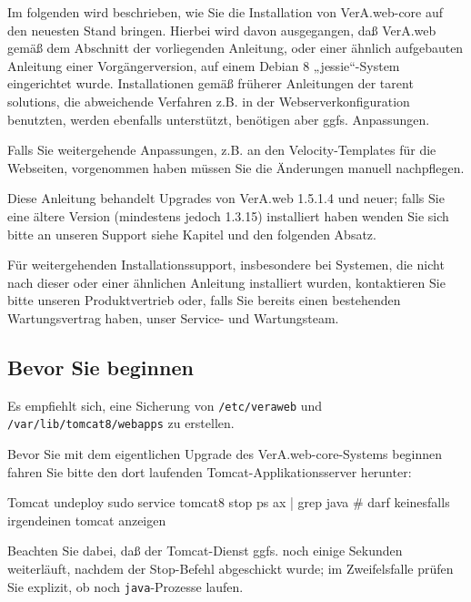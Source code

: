 \documentclass{tarentanleitung}
\begin{document}
Im folgenden wird beschrieben, wie Sie die Installation von
VerA.web-core auf den neuesten Stand bringen.
Hierbei wird davon ausgegangen, daß VerA.web gemäß
  dem Abschnitt  der vorliegenden Anleitung,
  oder einer ähnlich aufgebauten Anleitung einer Vorgängerversion,
auf einem Debian 8 „jessie“-System eingerichtet
wurde. Installationen gemäß früherer Anleitungen der tarent solutions,
die abweichende Verfahren z.B. in der Webserverkonfiguration benutzten,
werden ebenfalls unterstützt, benötigen aber ggfs. Anpassungen.

Falls Sie weitergehende Anpassungen, z.B. an den Velocity-Templates
für die Webseiten, vorgenommen haben müssen Sie die Änderungen
manuell nachpflegen.

Diese Anleitung behandelt Upgrades von VerA.web 1.5.1.4 und neuer;
falls Sie eine ältere Version (mindestens jedoch 1.3.15) installiert
haben wenden Sie sich bitte an unseren Support \dash siehe Kapitel
 und den folgenden Absatz.

Für weitergehenden Installationssupport, insbesondere bei Systemen,
die nicht nach dieser oder einer ähnlichen Anleitung installiert
wurden, kontaktieren Sie bitte unseren Produktvertrieb oder, falls
Sie bereits einen bestehenden Wartungsvertrag haben, unser Service-
und Wartungsteam.

\subsection{Bevor Sie beginnen}\label{subsec:upgrade-core-pre}

Es empfiehlt sich, eine Sicherung von \texttt{/etc/veraweb} und
\texttt{/var/lib/tomcat8/webapps} zu erstellen.

\begin{minipage}{\linewidth}
Bevor Sie mit dem eigentlichen Upgrade des VerA.web-core-Systems beginnen
fahren Sie bitte den dort laufenden Tomcat-Applikationsserver herunter:

\begin{lstdump}{Tomcat undeploy}
sudo service tomcat8 stop
ps ax | grep java               # darf keinesfalls irgendeinen tomcat anzeigen
\end{lstdump}

Beachten Sie dabei, daß der Tomcat-Dienst ggfs. noch einige Sekunden
weiterläuft, nachdem der Stop-Befehl abgeschickt wurde; im Zweifelsfalle
prüfen Sie explizit, ob noch \texttt{java}-Prozesse laufen.
\end{minipage}
\end{document}
